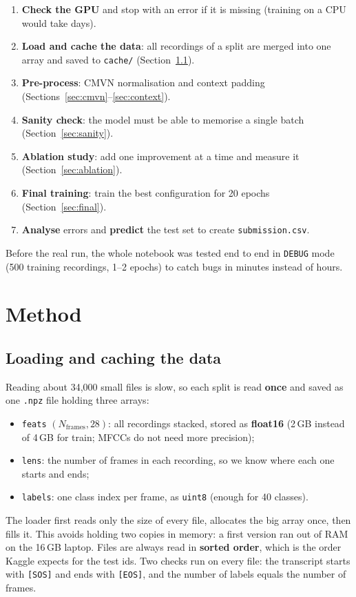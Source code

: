 \documentclass[11pt,a4paper]{article}
\begin{document}
\begin{enumerate}\itemsep0pt
  \item \textbf{Check the GPU} and stop with an error if it is missing (training on a CPU would take days).
  \item \textbf{Load and cache the data}: all recordings of a split are merged into one array and saved to
        \texttt{cache/} (Section~\ref{sec:loading}).
  \item \textbf{Pre-process}: CMVN normalisation and context padding (Sections~\ref{sec:cmvn}--\ref{sec:context}).
  \item \textbf{Sanity check}: the model must be able to memorise a single batch (Section~\ref{sec:sanity}).
  \item \textbf{Ablation study}: add one improvement at a time and measure it (Section~\ref{sec:ablation}).
  \item \textbf{Final training}: train the best configuration for 20 epochs (Section~\ref{sec:final}).
  \item \textbf{Analyse} errors and \textbf{predict} the test set to create \texttt{submission.csv}.
\end{enumerate}

Before the real run, the whole notebook was tested end to end in \texttt{DEBUG} mode (500 training
recordings, 1--2 epochs) to catch bugs in minutes instead of hours.

\section{Method}

\subsection{Loading and caching the data}\label{sec:loading}
Reading about 34,000 small files is slow, so each split is read \textbf{once} and saved as one
\texttt{.npz} file holding three arrays:
\begin{itemize}\itemsep0pt
  \item \texttt{feats} $(N_\text{frames}, 28)$: all recordings stacked, stored as \textbf{float16} (2\,GB
        instead of 4\,GB for train; MFCCs do not need more precision);
  \item \texttt{lens}: the number of frames in each recording, so we know where each one starts and ends;
  \item \texttt{labels}: one class index per frame, as \texttt{uint8} (enough for 40 classes).
\end{itemize}
The loader first reads only the size of every file, allocates the big array once, then fills it. This
avoids holding two copies in memory: a first version ran out of RAM on the 16\,GB laptop. Files are
always read in \textbf{sorted order}, which is the order Kaggle expects for the test ids. Two checks
run on every file: the transcript starts with \texttt{[SOS]} and ends with \texttt{[EOS]}, and the number
of labels equals the number of frames.
\end{document}

